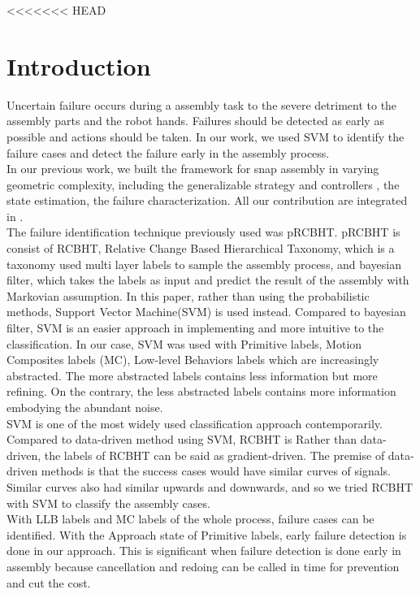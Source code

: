 <<<<<<< HEAD

\chapter{Introduction}

Uncertain failure occurs during a assembly task to the severe detriment to the assembly parts and the robot hands. Failures should be detected as early as possible and actions should be taken. In our work, we used SVM to identify the failure cases and detect the failure early in the assembly process. \\
\indent In our previous work, we built the framework for snap assembly in varying geometric complexity, including the generalizable strategy and controllers\cite{2012JAR-Rojas-AutHetBotAsmbly} \cite{2012ICMA-Rojas-PivotApproach}, the state estimation\cite{2012IROS-Rojas-RCBHT}, the failure characterization\cite{2012Humanoids-Rojas-pRCBHT}. All our contribution are integrated in \cite{2013IJMA-Rojas-TwrdsSnapSensing}. \\
\indent The failure identification technique previously used was pRCBHT\cite{2013IJMA-Rojas-TwrdsSnapSensing}. pRCBHT is consist of RCBHT, Relative Change Based Hierarchical Taxonomy, which is a taxonomy used multi layer labels to sample the assembly process, and bayesian filter, which takes the labels as input and predict the result of the assembly with Markovian assumption. In this paper, rather than using the probabilistic methods, Support Vector Machine(SVM) is used instead. Compared to bayesian filter, SVM is an easier approach in implementing and more intuitive to the classification. In our case, SVM was used with Primitive labels, Motion Composites labels (MC), Low-level Behaviors labels which are increasingly abstracted. The more abstracted labels contains less information but more refining. On the contrary, the less abstracted labels contains more information embodying the abundant noise. \\
\indent SVM is one of the most widely used classification approach contemporarily. Compared to data-driven method using SVM\cite{masonfailure}, RCBHT is Rather than data-driven, the labels of RCBHT can be said as gradient-driven. The premise of data-driven methods is that the success cases would have similar curves of signals. Similar curves also had similar upwards and downwards, and so we tried RCBHT with SVM to classify the assembly cases. \\
\indent With LLB labels and MC labels of the whole process, failure cases can be identified. With the Approach state of Primitive labels, early failure detection is done in our approach. This is significant when failure detection is done early in assembly because cancellation and redoing can be called in time for prevention and cut the cost.\\
